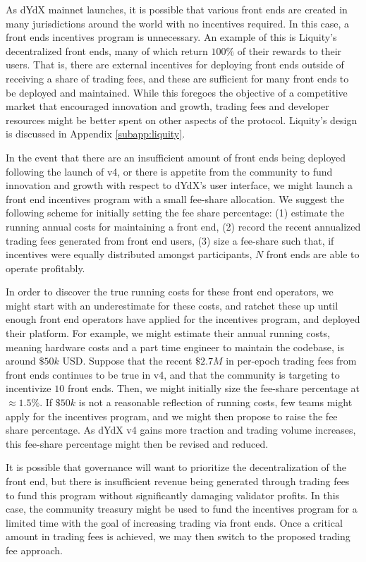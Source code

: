             As dYdX mainnet launches, it is possible that various front ends are created in many jurisdictions around the world with no incentives required. In this case, a front ends incentives program is unnecessary. An example of this is Liquity's decentralized front ends, many of which return $100\%$ of their rewards to their users. That is, there are external incentives for deploying front ends outside of receiving a share of trading fees, and these are sufficient for many front ends to be deployed and maintained. While this foregoes the objective of a competitive market that encouraged innovation and growth, trading fees and developer resources might be better spent on other aspects of the protocol. Liquity's design is discussed in Appendix \ref{subapp:liquity}.
    
            In the event that there are an insufficient amount of front ends being deployed following the launch of v4, or there is appetite from the community to fund innovation and growth with respect to dYdX's user interface, we might launch a front end incentives program with a small fee-share allocation. We suggest the following scheme for initially setting the fee share percentage: (1) estimate the running annual costs for maintaining a front end, (2) record the recent annualized trading fees generated from front end users, (3) size a fee-share such that, if incentives were equally distributed amongst participants, $N$ front ends are able to operate profitably. 
    
            In order to discover the true running costs for these front end operators, we might start with an underestimate for these costs, and ratchet these up until enough front end operators have applied for the incentives program, and deployed their platform. For example, we might estimate their annual running costs, meaning hardware costs and a part time engineer to maintain the codebase, is around $\$50k$ USD. Suppose that the recent $\$2.7M$ in per-epoch trading fees from front ends continues to be true in v4, and that the community is targeting to incentivize $10$ front ends. Then, we might initially size the fee-share percentage at $\approx 1.5\%$. If $\$50k$ is not a reasonable reflection of running costs, few teams might apply for the incentives program, and we might then propose to raise the fee share percentage. As dYdX v4 gains more traction and trading volume increases, this fee-share percentage might then be revised and reduced.
    
            It is possible that governance will want to prioritize the decentralization of the front end, but there is insufficient revenue being generated through trading fees to fund this program without significantly damaging validator profits. In this case, the community treasury might be used to fund the incentives program for a limited time with the goal of increasing trading via front ends. Once a critical amount in trading fees is achieved, we may then switch to the proposed trading fee approach. 
